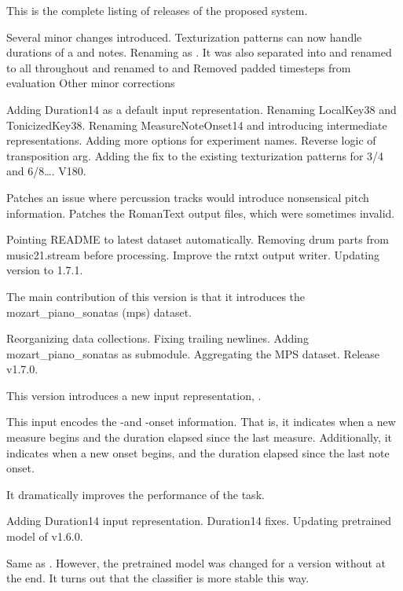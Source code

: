 This is the complete listing of releases of the proposed
system.

Several minor changes introduced. Texturization patterns can
now handle durations of a  and
 notes. Renaming  as
. It was also separated into
 and  
renamed to  all throughout
 and  renamed to
 and  Removed padded
timesteps from evaluation Other minor corrections

Adding Duration14 as a default input representation.
Renaming LocalKey38 and TonicizedKey38. Renaming
MeasureNoteOnset14 and introducing intermediate
representations. Adding more options for experiment names.
Reverse logic of transposition arg. Adding the fix to the
existing texturization patterns for 3/4 and 6/8…. V180.

Patches an issue where percussion tracks would introduce
nonsensical pitch information. Patches the RomanText output
files, which were sometimes invalid.

Pointing README to latest dataset automatically. Removing
drum parts from music21.stream before processing. Improve
the rntxt output writer. Updating version to 1.7.1.

The main contribution of this version is that it introduces
the mozart\_piano\_sonatas (mps) dataset.

Reorganizing data collections. Fixing trailing newlines.
Adding mozart\_piano\_sonatas as submodule. Aggregating the
MPS dataset. Release v1.7.0.

This version introduces a new input representation,
.

This input encodes the -and -onset
information. That is, it indicates when a new measure begins
and the duration elapsed since the last measure.
Additionally, it indicates when a new onset begins, and the
duration elapsed since the last note onset.

It dramatically improves the performance of the
 task.


Adding Duration14 input representation. Duration14 fixes.
Updating pretrained model of v1.6.0.

Same as . However, the pretrained model was
changed for a version without  at the end. It
turns out that the  classifier is more
stable this way.

